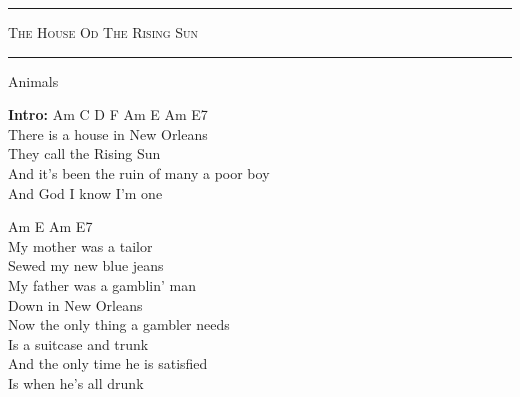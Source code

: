 \documentclass[10pt, twoside, a4paper]{article}
\begin{document}
\begin{center}

	\hrule \vspace{0.2cm}
     	\textsc{\LARGE The House Od The Rising Sun}
	\vspace{0.2cm} \hrule \vspace{0.2cm}
      	{\large Animals}
      	
\end{center}


		
\textbf{Intro:} Am C D F Am E Am E7 \\

There is a house in New Orleans  \\
They call the Rising Sun  \hspace{8pt}  \\
And it's been the ruin of many a poor boy \\
And God I know I'm one  \hspace{16pt}   \hspace{16pt}    \hspace{16pt} 

\hspace{21pt} Am \hspace{21pt} E \hspace{21pt} Am \hspace{21pt} E7 \\

My mother was a tailor \\
Sewed my new blue jeans \\
My father was a gamblin' man \\
Down in New Orleans \\

Now the only thing a gambler needs \\
Is a suitcase and trunk \\
And the only time he is satisfied \\
Is when he's all drunk \\
\end{document}
